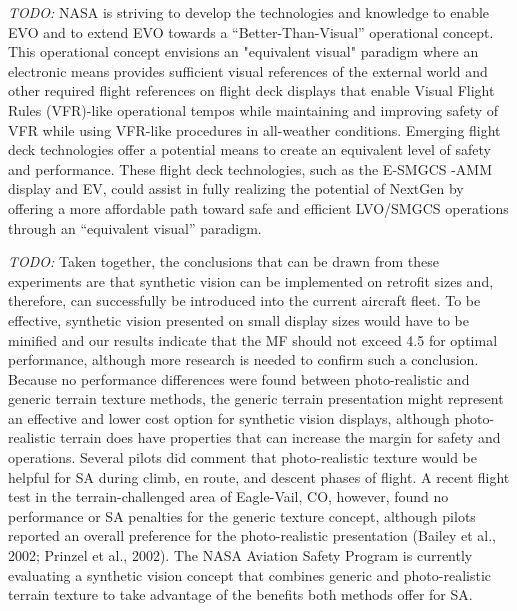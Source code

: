 \documentclass[utf8,bachelor,manualbib]{gradu3}
\begin{document}
\emph{TODO:}
NASA is striving to develop the technologies and knowledge to enable EVO and to extend EVO towards a “Better-Than-Visual” operational concept. This operational concept envisions an "equivalent visual" paradigm where an electronic means provides sufficient visual references of the external world and other required flight references on flight deck displays that enable Visual Flight Rules (VFR)-like operational tempos while maintaining and improving safety of VFR while using VFR-like procedures in all-weather conditions.\citep{prinzel2013}
Emerging flight deck technologies offer a potential means to create an equivalent level of safety and performance. These flight deck technologies, such as the E-SMGCS -AMM display and EV, could assist in fully realizing the potential of NextGen by offering a more affordable path toward safe and efficient LVO/SMGCS operations through an “equivalent visual” paradigm.\citep{prinzel2013}

\emph{TODO:}
Taken together, the conclusions that can be drawn from these experiments are that
synthetic vision can be implemented on retrofit sizes and, therefore, can successfully
be introduced into the current aircraft fleet. To be effective, synthetic vision
presented on small display sizes would have to be minified and our results indicate
that the MF should not exceed 4.5 for optimal performance, although more research
is needed to confirm such a conclusion.
Because no performance differences were found between photo-realistic and
generic terrain texture methods, the generic terrain presentation might represent an
effective and lower cost option for synthetic vision displays, although photo-realistic
terrain does have properties that can increase the margin for safety and operations.
Several pilots did comment that photo-realistic texture would be helpful for
SA during climb, en route, and descent phases of flight. A recent flight test in the
terrain-challenged area of Eagle-Vail, CO, however, found no performance or SA
penalties for the generic texture concept, although pilots reported an overall preference
for the photo-realistic presentation (Bailey et al., 2002; Prinzel et al., 2002).
The NASA Aviation Safety Program is currently evaluating a synthetic vision concept
that combines generic and photo-realistic terrain texture to take advantage of
the benefits both methods offer for SA. \citep{prinzel2004}
\end{document}
